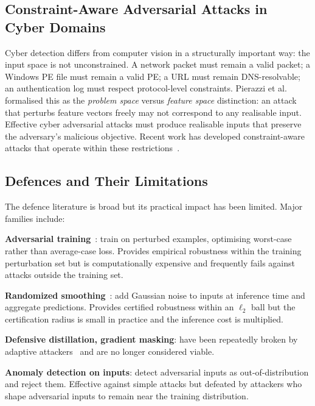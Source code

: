 \documentclass[sigconf,nonacm]{acmart}
\begin{document}
\subsection{Constraint-Aware Adversarial Attacks in Cyber Domains}

Cyber detection differs from computer vision in a structurally important way:
the input space is not unconstrained. A network packet must remain a valid
packet; a Windows PE file must remain a valid PE; a URL must remain
DNS-resolvable; an authentication log must respect protocol-level
constraints. Pierazzi et al.~\cite{pierazzi2020intriguing} formalised this as
the \emph{problem space} versus \emph{feature space} distinction: an attack
that perturbs feature vectors freely may not correspond to any realisable
input. Effective cyber adversarial attacks must produce realisable inputs
that preserve the adversary's malicious objective. Recent work has developed
constraint-aware attacks that operate within these
restrictions~\cite{sheatsley2022prc,debenedetti2022pgd}.

\subsection{Defences and Their Limitations}

The defence literature is broad but its practical impact has been limited. Major
families include:

\textbf{Adversarial training}~\cite{madry2018pgd}: train on perturbed examples,
optimising worst-case rather than average-case loss. Provides empirical
robustness within the training perturbation set but is computationally
expensive and frequently fails against attacks outside the training set.

\textbf{Randomized smoothing}~\cite{cohen2019randomized}: add Gaussian noise to
inputs at inference time and aggregate predictions. Provides certified
robustness within an $\ell_2$ ball but the certification radius is small in
practice and the inference cost is multiplied.

\textbf{Defensive distillation, gradient masking}: have been repeatedly broken
by adaptive attackers~\cite{carlini2017obfuscated} and are no longer
considered viable.

\textbf{Anomaly detection on inputs}: detect adversarial inputs as
out-of-distribution and reject them. Effective against simple attacks but
defeated by attackers who shape adversarial inputs to remain near the
training distribution.
\end{document}
